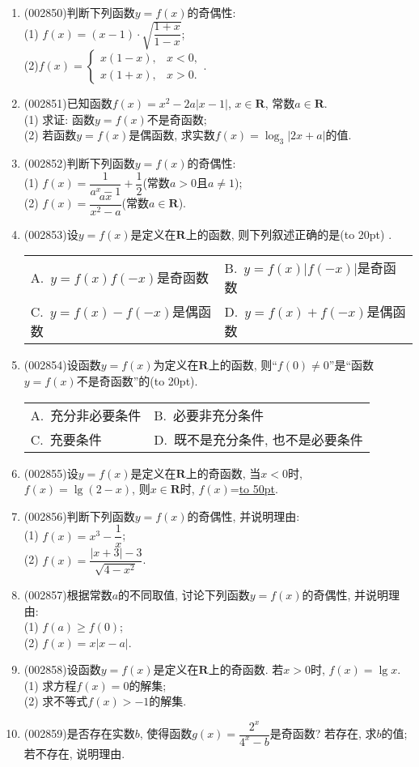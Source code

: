\documentclass[10pt,a4paper]{article}
\newcommand{\blank}[1]{\underline{\hbox to #1pt{}}}
\newcommand{\bracket}[1]{(\hbox to #1pt{})}
\newcommand{\twoch}[4]{\par\begin{tabular}{p{.46\textwidth}p{.46\textwidth}}
A.~#1& B.~#2\\
C.~#3& D.~#4
\end{tabular}}
\begin{document}
\begin{enumerate}[1.]
(2) 若函数$y=F(x)$在$(0,+\infty)$上存在最大值$4$, 则$y=F(x)$在$(-\infty ,0)$上的最小值为\blank{50}.
\item {\tiny (002850)}判断下列函数$y=f(x)$的奇偶性:\\
(1) $f(x)=(x-1)\cdot \sqrt{\dfrac{1+x}{1-x}}$;\\
(2)$f(x)=\begin{cases} x(1-x), & x<0, \\ x(1+x),& x>0. \end{cases}$.
\item {\tiny (002851)}已知函数$f(x)=x^2-2a|x-1|$, $x\in \mathbf{R}$, 常数$a\in \mathbf{R}$.\\
(1) 求证: 函数$y=f(x)$不是奇函数;\\
(2) 若函数$y=f(x)$是偶函数, 求实数$f(x)=\log_3| 2x+a |$的值.
\item {\tiny (002852)}判断下列函数$y=f(x)$的奇偶性:\\
(1) $f(x)=\dfrac 1{a^x-1}+\dfrac 12$(常数$a>0$且$a\ne 1$);\\
(2) $f(x)=\dfrac{ax}{x^2-a}$(常数$a\in \mathbf{R}$).
\item {\tiny (002853)}设$y=f(x)$是定义在$\mathbf{R}$上的函数, 则下列叙述正确的是\bracket{20} .
\twoch{$y=f(x)f(-x)$是奇函数}{$y=f(x)|f(-x)|$是奇函数}{$y=f(x)-f(-x)$是偶函数	}{$y=f(x)+f(-x)$是偶函数}
\item {\tiny (002854)}设函数$y=f(x)$为定义在$\mathbf{R}$上的函数, 则``$f(0)\ne 0$''是``函数$y=f(x)$不是奇函数''的\bracket{20}.
\twoch{充分非必要条件}{必要非充分条件}{充要条件}{既不是充分条件, 也不是必要条件}
\item {\tiny (002855)}设$y=f(x)$是定义在$\mathbf{R}$上的奇函数, 当$x<0$时, $f(x)=\lg(2-x)$, 则$x\in \mathbf{R}$时, $f(x)$=\blank{50}.
\item {\tiny (002856)}判断下列函数$y=f(x)$的奇偶性, 并说明理由:\\
(1) $f(x)=x^3-\dfrac 1x$;\\
(2) $f(x)=\dfrac{|x+3|-3}{\sqrt{4-x^2}}$.
\item {\tiny (002857)}根据常数$a$的不同取值, 讨论下列函数$y=f(x)$的奇偶性, 并说明理由:\\
(1) $f(a)\ge f(0)$;\\
(2) $f(x)=x|x-a|$.
\item {\tiny (002858)}设函数$y=f(x)$是定义在$\mathbf{R}$上的奇函数. 若$x>0$时, $f(x)=\lg x$.\\
(1) 求方程$f(x)=0$的解集;\\
(2) 求不等式$f(x)>-1$的解集.
\item {\tiny (002859)}是否存在实数$b$, 使得函数$g(x)=\dfrac{2^x}{{4^x}-b}$是奇函数? 若存在, 求$b$的值; 若不存在, 说明理由.

\end{enumerate}
\end{document}
